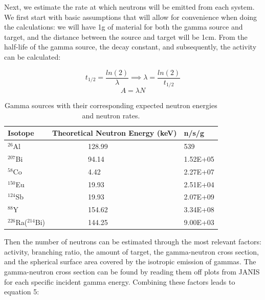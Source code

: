\documentclass[%
12pt,
twoside,
reprint,
amsmath,amssymb,
aps,
]{article}
\begin{document}
	\par Next, we estimate the rate at which neutrons will be emitted from each system. We first start with basic assumptions that will allow for convenience when doing the calculations: we will have 1g of material for both the gamma source and target, and the distance between the source and target will be 1cm. From the half-life of the gamma source, the decay constant, and subsequently, the activity can be calculated:
	
	\begin{equation*}
	t_{1/2} = \frac{ln(2)}{\lambda} \implies \lambda = \frac{ln(2)}{t_{1/2}}
	\end{equation*}
	\begin{equation*}
	A = \lambda N
	\end{equation*}
	
	\begin{table}
		\begin{center}
			\scriptsize
			\begin{tabular}{p{3.1cm} p{3.1cm} p{3.1cm}}
				\hline
				\textbf{Isotope} & \textbf{Theoretical Neutron Energy (keV)} & \textbf{n/s/g} \\ \hline
				$^{26}$Al &\ \ \ \ \ \ \ \ \ \ 128.99 & 539 \\ \hline
				$^{207}$Bi &\ \ \ \ \ \ \ \ \ \ 94.14 & 1.52E+05 \\ \hline
				$^{58}$Co &\ \ \ \ \ \ \ \ \ \ 4.42 & 2.27E+07 \\ \hline
				$^{150}$Eu &\ \ \ \ \ \ \ \ \ \ 19.93 & 2.51E+04 \\ \hline
				$^{124}$Sb &\ \ \ \ \ \ \ \ \ \ 19.93 & 2.07E+09 \\ \hline
				$^{88}$Y &\ \ \ \ \ \ \ \ \ \ 154.62 & 3.34E+08 \\ \hline
				$^{226}$Ra($^{214}$Bi) &\ \ \ \ \ \ \ \ \ \ 144.25 & 9.00E+03 \\ \hline
			\end{tabular}
			\caption{Gamma sources with their corresponding expected neutron energies and neutron rates.}
		\end{center}
	\end{table}
	
	\noindent Then the number of neutrons can be estimated through the most relevant factors: activity, branching ratio, the amount of target, the gamma-neutron cross section, and the spherical surface area covered by the isotropic emission of gammas. The gamma-neutron cross section can be found by reading them off plots from JANIS for each specific incident gamma energy. Combining these factors leads to equation 5:
	
\end{document}
